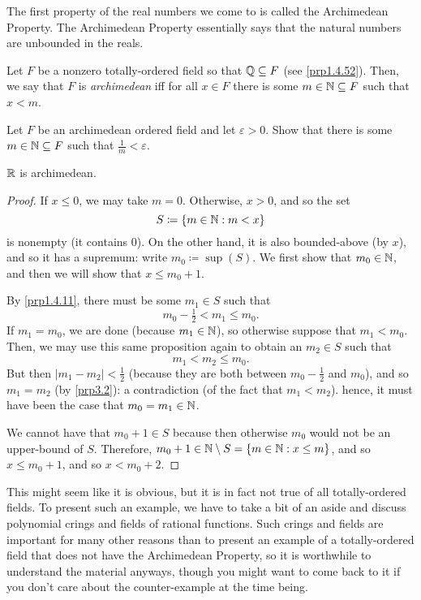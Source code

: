 The first property of the real numbers we come to is called the Archimedean Property.  The Archimedean Property essentially says that the natural numbers are unbounded in the reals.
\begin{dfn}
Let $F$ be a nonzero totally-ordered field so that $\mathbb{Q} \subseteq F$ (see \cref{prp1.4.52}).  Then, we say that $F$ is \emph{archimedean} iff for all $x\in F$ there is some $m\in \mathbb{N} \subseteq F$ such that $x<m$.
\end{dfn}
\begin{exr}\label{exr3.1.6}
Let $F$ be an archimedean ordered field and let $\varepsilon >0$.  Show that there is some $m\in \mathbb{N} \subseteq F$ such that $\frac{1}{m}<\varepsilon$.
\end{exr}
\begin{thm}\label{thm3.2.3}
$\mathbb{R}$ is archimedean.
\begin{proof}
If $x\leq 0$, we may take $m=0$.  Otherwise, $x>0$, and so the set
\begin{equation}
S\coloneqq \left\{ m\in \mathbb{N} :m<x\right\} 
\end{equation}
is nonempty (it contains $0$).  On the other hand, it is also bounded-above (by $x$), and so it has a supremum:  write $m_0\coloneqq \sup (S)$.  We first show that $m_0\in \mathbb{N}$, and then we will show that $x\leq m_0+1$.

By \cref{prp1.4.11}, there must be some $m_1\in S$ such that
\begin{equation}
m_0-\tfrac{1}{2}<m_1\leq m_0.
\end{equation}
If $m_1=m_0$, we are done (because $m_1\in \mathbb{N}$), so otherwise suppose that $m_1<m_0$.  Then, we may use this same proposition again to obtain an $m_2\in S$ such that
\begin{equation}
m_1<m_2\leq m_0.
\end{equation}
But then $|m_1-m_2|<\frac{1}{2}$ (because they are both between $m_0-\frac{1}{2}$ and $m_0$), and so $m_1=m_2$ (by \cref{prp3.2}):  a contradiction (of the fact that $m_1<m_2$).  hence, it must have been the case that $m_0=m_1\in \mathbb{N}$.

We cannot have that $m_0+1\in S$ because then otherwise $m_0$ would not be an upper-bound of $S$.  Therefore, $m_0+1\in \mathbb{N} \setminus S=\left\{ m\in \mathbb{N} :x\leq m\right\}$, and so $x\leq m_0+1$, and so $x<m_0+2$.
\end{proof}
\end{thm}
This might seem like it is obvious, but it is in fact not true of all totally-ordered fields.  To present such an example, we have to take a bit of an aside and discuss polynomial crings and fields of rational functions.  Such crings and fields are important for many other reasons than to present an example of a totally-ordered field that does not have the Archimedean Property, so it is worthwhile to understand the material anyways, though you might want to come back to it if you don't care about the counter-example at the time being.

